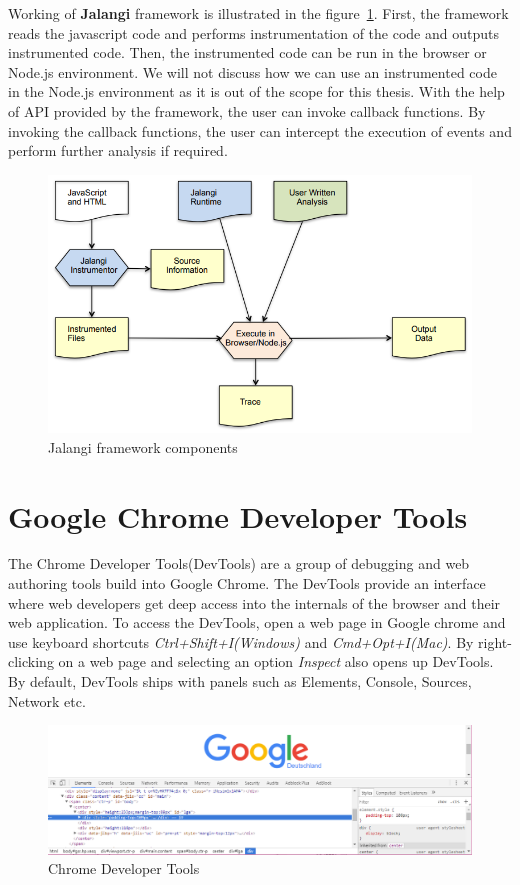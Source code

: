 Working of \textbf{Jalangi} framework is illustrated in the figure~\ref{fig:jalangi-components}. First, the framework reads the javascript code and performs instrumentation of the code and outputs instrumented code. Then, the instrumented code can be run in the browser or Node.js environment. We will not discuss how we can use an instrumented code in the Node.js environment as it is out of the scope for this thesis. With the help of API provided by the framework, the user can invoke callback functions. By invoking the callback functions, the user can intercept the execution of events and perform further analysis if required. 

\begin{figure}[!h]
	\centering
	\includegraphics[scale=0.5,trim=0 0 0 0]{images/jalangi-components.png}
	\caption{Jalangi framework components}
	\label{fig:jalangi-components}
\end{figure}

\section{Google Chrome Developer Tools}
The Chrome Developer Tools(DevTools) are a group of debugging and web authoring tools build into Google Chrome\cite{devtools}. The DevTools provide an interface where web developers get deep access into the internals of the browser and their web application. To access the DevTools, open a web page in Google chrome and use keyboard shortcuts \textit{Ctrl+Shift+I(Windows)} and \textit{Cmd+Opt+I(Mac)}. By right-clicking on a web page and selecting an option \textit{Inspect} also opens up DevTools. By default, DevTools ships with panels such as Elements, Console, Sources, Network etc.

\begin{figure}[!h]
	\centering
	\includegraphics[scale=0.5,trim=0 0 0 0]{images/chrome-devtools.png}
	\caption{Chrome Developer Tools}
	\label{fig:devtools}
\end{figure}

